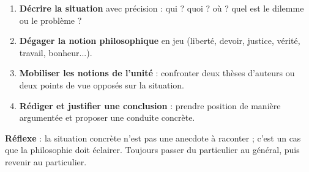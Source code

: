 \documentclass[11pt]{article}
\newcommand{\cle}[1]{{\popxbold\color{popdark}#1}}
\begin{document}
\begin{methode}
\begin{enumerate}
\item \textbf{Décrire la situation} avec précision : qui ? quoi ? où ? quel est le dilemme ou le problème ?
\item \textbf{Dégager la notion philosophique} en jeu (liberté, devoir, justice, vérité, travail, bonheur...).
\item \textbf{Mobiliser les notions de l'unité} : confronter deux thèses d'auteurs ou deux points de vue opposés sur la situation.
\item \textbf{Rédiger et justifier une conclusion} : prendre position de manière argumentée et proposer une conduite concrète.
\end{enumerate}
\textbf{Réflexe} : la situation concrète n'est pas une anecdote à raconter ; c'est un \cle{cas} que la philosophie doit éclairer. Toujours passer du particulier au général, puis revenir au particulier.
\end{methode}
\end{document}
